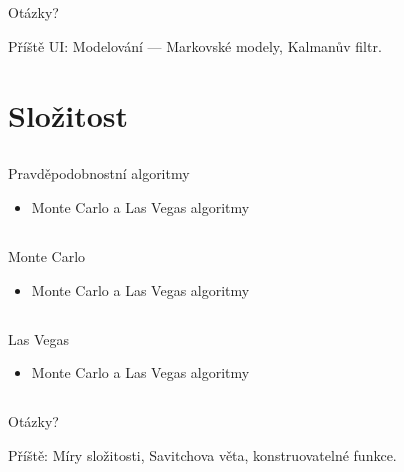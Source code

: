 \documentclass{beamer}
\begin{document}
\subsection{}
\begin{frame}{Otázky?}
\begin{center}
Příště UI: Modelování --- Markovské modely, Kalmanův filtr.
\end{center}
\end{frame}

\section{Složitost}

\subsection{}
\begin{frame}{Pravděpodobnostní algoritmy}
\begin{itemize}
\item Monte Carlo a Las Vegas algoritmy
\end{itemize}
\end{frame}

\subsection{}
\begin{frame}{Monte Carlo}
\begin{itemize}
\item Monte Carlo a Las Vegas algoritmy
\end{itemize}
\end{frame}

\subsection{}
\begin{frame}{Las Vegas}
\begin{itemize}
\item Monte Carlo a Las Vegas algoritmy
\end{itemize}
\end{frame}

\subsection{}
\begin{frame}{Otázky?}
\begin{center}
Příště: Míry složitosti, Savitchova věta, konstruovatelné funkce.
\end{center}
\end{frame}
\end{document}
